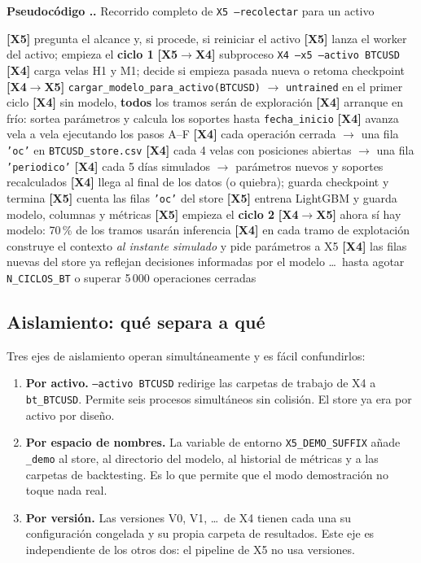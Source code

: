 \documentclass[11pt,a4paper]{article}
\newcommand{\code}[1]{\texttt{\small #1}}
\newcounter{pcode}[section]
\renewcommand{\thepcode}{\thesection.\arabic{pcode}}
\newenvironment{pseudo}[1]{%
  \par\medskip\noindent
  \refstepcounter{pcode}%
  \colorbox{cfondo}{\parbox{\dimexpr\linewidth-2\fboxsep\relax}{%
    \small\textbf{\textcolor{cazul}{Pseudocódigo \thepcode.}} #1}}%
  \par\nobreak\smallskip\begin{algorithmic}[1]%
}{\end{algorithmic}\par\medskip}
\begin{document}
\begin{pseudo}{Recorrido completo de \code{X5 --recolectar} para un activo}
\State \textbf{[X5]} pregunta el alcance y, si procede, si reiniciar el activo
\State \textbf{[X5]} lanza el worker del activo; empieza el \textbf{ciclo 1}
\State \quad \textbf{[X5$\to$X4]} subproceso \code{X4 --x5 --activo BTCUSD}
\State \quad \textbf{[X4]} carga velas H1 y M1; decide si empieza pasada nueva o retoma checkpoint
\State \quad \textbf{[X4$\to$X5]} \code{cargar_modelo_para_activo(BTCUSD)} $\to$ \code{untrained} en el primer ciclo
\State \quad \textbf{[X4]} sin modelo, \textbf{todos} los tramos serán de exploración
\State \quad \textbf{[X4]} arranque en frío: sortea parámetros y calcula los soportes hasta \code{fecha_inicio}
\State \quad \textbf{[X4]} avanza vela a vela ejecutando los pasos A--F
\State \quad \textbf{[X4]} cada operación cerrada $\to$ una fila \code{'oc'} en \code{BTCUSD_store.csv}
\State \quad \textbf{[X4]} cada 4 velas con posiciones abiertas $\to$ una fila \code{'periodico'}
\State \quad \textbf{[X4]} cada 5 días simulados $\to$ parámetros nuevos y soportes recalculados
\State \quad \textbf{[X4]} llega al final de los datos (o quiebra); guarda checkpoint y termina
\State \textbf{[X5]} cuenta las filas \code{'oc'} del store
 \textbf{[X5]} entrena LightGBM y guarda modelo, columnas y métricas \EndIf
\State \textbf{[X5]} empieza el \textbf{ciclo 2}
\State \quad \textbf{[X4$\to$X5]} ahora sí hay modelo: 70\,\% de los tramos usarán inferencia
\State \quad \textbf{[X4]} en cada tramo de explotación construye el contexto \textit{al instante simulado} y pide parámetros a X5
\State \quad \textbf{[X4]} las filas nuevas del store ya reflejan decisiones informadas por el modelo
\State \dots\ hasta agotar \code{N_CICLOS_BT} o superar 5\,000 operaciones cerradas
\end{pseudo}

\subsection{Aislamiento: qué separa a qué}

Tres ejes de aislamiento operan simultáneamente y es fácil confundirlos:

\begin{enumerate}[leftmargin=1.6em,itemsep=3pt]
\item \textbf{Por activo.} \code{--activo BTCUSD} redirige las carpetas de trabajo de X4 a
\code{bt_BTCUSD}. Permite seis procesos simultáneos sin colisión. El store ya era por activo
por diseño.
\item \textbf{Por espacio de nombres.} La variable de entorno \code{X5_DEMO_SUFFIX} añade
\code{_demo} al store, al directorio del modelo, al historial de métricas y a las carpetas
de backtesting. Es lo que permite que el modo demostración no toque nada real.
\item \textbf{Por versión.} Las versiones V0, V1, \dots\ de X4 tienen cada una su
configuración congelada y su propia carpeta de resultados. Este eje es independiente de los
otros dos: el pipeline de X5 no usa versiones.
\end{enumerate}
\end{document}
